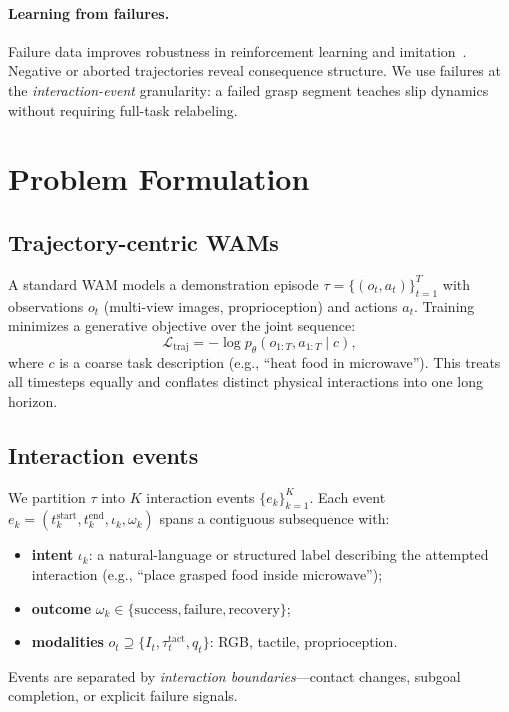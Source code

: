 \documentclass{article}
\begin{document}
\paragraph{Learning from failures.}
Failure data improves robustness in reinforcement learning and imitation~\citep{sinapov2014learning,bodnar2024fail}.
Negative or aborted trajectories reveal consequence structure.
We use failures at the \emph{interaction-event} granularity: a failed grasp segment teaches slip dynamics without requiring full-task relabeling.

\section{Problem Formulation}
\label{sec:problem}

\subsection{Trajectory-centric WAMs}
A standard WAM models a demonstration episode $\tau = \{(o_t, a_t)\}_{t=1}^{T}$ with observations $o_t$ (multi-view images, proprioception) and actions $a_t$.
Training minimizes a generative objective over the joint sequence:
\begin{equation}
    \mathcal{L}_{\text{traj}} = -\log p_\theta(o_{1:T}, a_{1:T} \mid c),
\end{equation}
where $c$ is a coarse task description (e.g., ``heat food in microwave'').
This treats all timesteps equally and conflates distinct physical interactions into one long horizon.

\subsection{Interaction events}
We partition $\tau$ into $K$ interaction events $\{e_k\}_{k=1}^{K}$.
Each event $e_k = (t_k^{\text{start}}, t_k^{\text{end}}, \iota_k, \omega_k)$ spans a contiguous subsequence with:
\begin{itemize}
    \item \textbf{intent} $\iota_k$: a natural-language or structured label describing the attempted interaction (e.g., ``place grasped food inside microwave'');
    \item \textbf{outcome} $\omega_k \in \{\text{success}, \text{failure}, \text{recovery}\}$;
    \item \textbf{modalities} $o_t \supseteq \{I_t, \tau^{\text{tact}}_t, q_t\}$: RGB, tactile, proprioception.
\end{itemize}
Events are separated by \emph{interaction boundaries}---contact changes, subgoal completion, or explicit failure signals.
\end{document}

